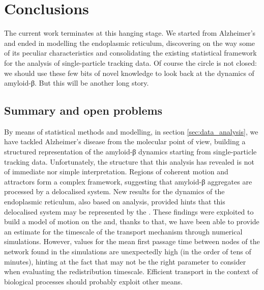 
\chapter{Conclusions}

The current work terminates at this hanging stage. We started from Alzheimer's and ended in modelling the endoplasmic reticulum, discovering on the way some of its peculiar characteristics and consolidating the existing statistical framework for the analysis of single-particle tracking data. Of course the circle is not closed: we should use these few bits of novel knowledge to look back at the dynamics of amyloid-β. But this will be another long story.

\section{Summary and open problems}

By means of statistical methods and modelling, in section \ref{sec:data_analysis}, we have tackled Alzheimer's disease from the molecular point of view, building a structured representation of the amyloid-β dynamics starting from single-particle tracking data.
Unfortunately, the structure that this analysis has revealed is not of immediate nor simple interpretation.
Regions of coherent motion and attractors form a complex framework, suggesting that amyloid-β aggregates are processed by a delocalised system.
New results for the dynamics of the endoplasmic reticulum, also based on  analysis, provided hints that this delocalised system may be represented by the .
These findings were exploited to build a model of motion on the  and, thanks to that, we have been able to provide an estimate for the timescale of the  transport mechanism through numerical simulations.
However, values for the mean first passage time between nodes of the network found in the simulations are unexpectedly high (in the order of tens of minutes), hinting at the fact that  may not be the right parameter to consider when evaluating the redistribution timescale. Efficient transport in the context of biological processes should probably exploit other means.

